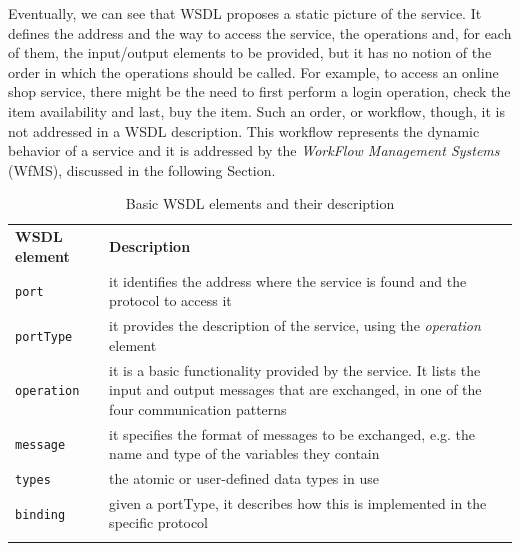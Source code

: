 Eventually, we can see that WSDL proposes a static picture of the service. It defines the address and the way to access the service, the operations and, for each of them, the input/output elements to be provided, but it has no notion of the order in which the operations should be called. For example, to access an online shop service, there might be the need to first perform a login operation, check the item availability and last, buy the item. Such an order, or workflow, though, it is not addressed in a WSDL description. This workflow represents the dynamic behavior of a service and it is addressed by the \textit{WorkFlow Management Systems} (WfMS), discussed in the following Section.


% 
\begin{table}
\caption{Basic WSDL elements and their description}
\label{tab:WSDLElements}
\begin{center}
\begin{tabular}{l p{11cm}}

						\toprule
						\addlinespace[0.2cm]
\textbf{WSDL element} 	& \textbf{Description}	\\ 
						\cmidrule(l){1-2}
\verb|port| 		& it identifies the address where the service is found and the protocol to access it 				\\[0,1cm]
\verb|portType| 	& it provides the description of the service, using the \textit{operation} element 				\\[0,1cm]
\verb|operation| 	& it is a basic functionality provided by the service. It lists the input and output messages that are exchanged, in one of the four communication patterns 														\\[0,1cm]
\verb|message| 		& it specifies the format of messages to be exchanged, e.g. the name and type of the variables they contain 	\\[0,1cm]
\verb|types|		& the atomic or user-defined data types in use  								\\[0,1cm]
\verb|binding|		& given a portType, it describes how this is implemented in the specific protocol 				\\[0,1cm]
	 
						\addlinespace[0.2cm]
						\bottomrule
\end{tabular}
\end{center}
\end{table}

